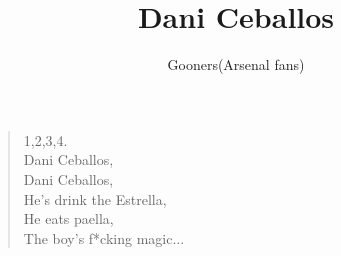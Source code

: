 \documentclass[a4paper,12pt]{article}
\title{Dani Ceballos}
\author{Gooners(Arsenal fans)}
\date{}
\begin{document}
	
	\maketitle
	
	\begin{verse}
		
		1,2,3,4. \\
		Dani Ceballos, \\
		Dani Ceballos, \\
		He's drink the Estrella, \\
		He eats paella, \\
		The boy's f*cking magic$\ldots$
		
	\end{verse}
	
\end{document}
